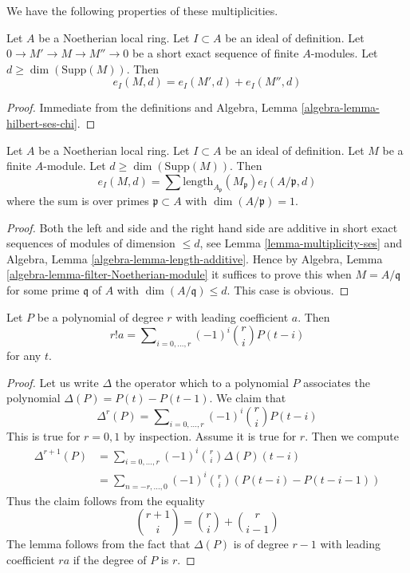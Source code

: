 \noindent
We have the following properties of these multiplicities.

\begin{lemma}
\label{lemma-multiplicity-ses}
Let $A$ be a Noetherian local ring. Let $I \subset A$ be an ideal of
definition. Let $0 \to M' \to M \to M'' \to 0$ be a short exact sequence
of finite $A$-modules. Let $d \geq \dim(\text{Supp}(M))$. Then
$$
e_I(M, d) = e_I(M', d) + e_I(M'', d)
$$
\end{lemma}

\begin{proof}
Immediate from the definitions and
Algebra, Lemma \ref{algebra-lemma-hilbert-ses-chi}.
\end{proof}

\begin{lemma}
\label{lemma-multiplicity-as-a-sum}
Let $A$ be a Noetherian local ring. Let $I \subset A$ be an ideal of
definition. Let $M$ be a finite $A$-module. Let $d \geq \dim(\text{Supp}(M))$.
Then
$$
e_I(M, d) =
\sum \text{length}_{A_\mathfrak p}(M_\mathfrak p) e_I(A/\mathfrak p, d)
$$
where the sum is over primes $\mathfrak p \subset A$ with
$\dim(A/\mathfrak p) = 1$.
\end{lemma}

\begin{proof}
Both the left and side and the right hand side are additive in short
exact sequences of modules of dimension $\leq d$, see
Lemma \ref{lemma-multiplicity-ses} and
Algebra, Lemma \ref{algebra-lemma-length-additive}.
Hence by Algebra, Lemma \ref{algebra-lemma-filter-Noetherian-module}
it suffices to prove this when $M = A/\mathfrak q$ for some
prime $\mathfrak q$ of $A$ with $\dim(A/\mathfrak q) \leq d$.
This case is obvious.
\end{proof}

\begin{lemma}
\label{lemma-leading-coefficient}
Let $P$ be a polynomial of degree $r$ with leading coefficient $a$.
Then
$$
r! a = \sum\nolimits_{i = 0, \ldots, r} (-1)^i{r \choose i} P(t - i)
$$
for any $t$.
\end{lemma}

\begin{proof}
Let us write $\Delta$ the operator which to a polynomial $P$ associates
the polynomial $\Delta(P) = P(t) - P(t - 1)$. We claim that
$$
\Delta^r(P) = \sum\nolimits_{i = 0, \ldots, r} (-1)^i {r \choose i} P(t - i)
$$
This is true for $r = 0, 1$ by inspection. Assume it is true for $r$.
Then we compute
\begin{align*}
\Delta^{r + 1}(P)
& =
\sum\nolimits_{i = 0, \ldots, r} (-1)^i {r \choose i} \Delta(P)(t - i) \\
& =
\sum\nolimits_{n = -r, \ldots, 0} (-1)^i {r \choose i}
(P(t - i) - P(t - i - 1))
\end{align*}
Thus the claim follows from the equality
$$
{r + 1 \choose i} = {r \choose i} + {r \choose i - 1}
$$
The lemma follows from the fact that $\Delta(P)$ is of degree $r - 1$
with leading coefficient $ra$ if the degree of $P$ is $r$.
\end{proof}

